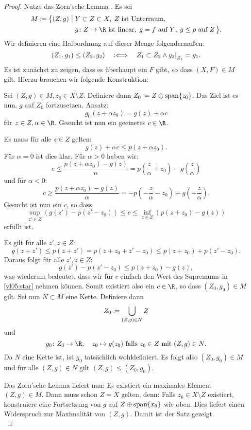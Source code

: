 \begin{proof}
    Nutze das Zorn'sche Lemma .
    Es sei 
    \begin{align*}
        M \defeq 
        \bigl\{ (Z,g) \cMid\big
            &Y\subset Z\subset X, \; \text{$Z$ ist Unterraum},
            \\
            &g\colon Z\to\R \text{ ist linear}, \;
            g=f \text{ auf $Y$}, \; g\leq p \text{ auf $Z$}
        \,\bigr\}
    .  \end{align*}
    Wir definieren eine Halbordnung auf dieser Menge folgendermaßen:
    \[ (Z_1,g_1) \leq (Z_2,g_2)  \quad\eqiff\quad
        Z_1\subset Z_2 \wedge g_2\vert_{\raisebox{-2pt}{$\scriptstyle Z_1$}} = g_1
    . \]
    Es ist zunächst zu zeigen, dass es überhaupt ein $F$ gibt, so dass $(X,F)\in
    M$ gilt. Hierzu brauchen wir folgende Konstruktion:
    
    Sei $(Z,g)\in M, z_0\in X\setminus Z$. Definiere dann $Z_0\coloneqq
    Z\oplus\operatorname{span}\{z_0\}$. Das Ziel ist es nun, $g$ auf $Z_0$ fortzusetzen.
    Ansatz:
    \[ g_0(z+\alpha z_0) = g(z) + \alpha c \]
    für $z\in Z,\alpha\in\R$. Gesucht ist nun ein geeinetes $c\in\R$.
    
    Es muss für alle $z\in Z$ gelten:
    \[ g(z) + \alpha c \leq p(z+\alpha z_0)  . \]
    Für $\alpha=0$ ist dies klar. Für $\alpha>0$ haben wir:
    \[ c \leq \frac{p(z+\alpha z_0)-g(z)}{\alpha} 
        = p\left( \frac{z}{\alpha} + z_0 \right) - g\left( \frac{z}{\alpha} \right)
    \]
    und für $\alpha<0$:
    \[ c \geq \frac{p(z+\alpha z_0)-g(z)}{\alpha} 
        = -p\left( -\frac{z}{\alpha} - z_0 \right) + g\left( -\frac{z}{\alpha} \right)
    . \]
    Gesucht ist nun ein $c$, so dass
    \[ \tag{$\star$} \label{vl05:star}
        \sup_{z'\in Z} \left( g(z') - p(z'-z_0) \right)
        \leq c \leq
        \inf_{z\in Z} \left( p(z+z_0) - g(z) \right)
    \]
    erfüllt ist.
    
    Es gilt für alle $z',z\in Z$:
    \[ g(z+z') \leq p(z+z') 
        = p(z+z_0+z'-z_0) \leq p(z+z_0) + p(z'-z_0)
    . \]
    Daraus folgt für alle $z',z\in Z$:    
    \[ g(z') - p(z'-z_0) \leq p(z+z_0) - g(z)  , \]
    was wiederum bedeutet, dass wir für $c$ einfach den Wert des Supremums 
    in \eqref{vl05:star} nehmen können.
    Somit existiert also ein $c\in\R$, so dass $(Z_0,g_0)\in M$ gilt.
    Sei nun $N\subset M$ eine Kette. Definiere dann
    \[ Z_0 \coloneqq \bigcup_{(Z,g)\in N} Z \]
    und
    \[ g_0\colon Z_0\to\R, \quad z_0\mapsto g(z_0) \text{ falls $z_0\in Z$ mit
        $(Z,g)\in N$}
    . \]
    Da $N$ eine Kette ist, ist $g_0$ tatsächlich wohldefiniert. Es folgt also
    $(Z_0,g_0)\in M$ und für alle $(Z,g)\in N$ gilt $(Z,g)\leq (Z_0,g_0)$.
    
    Das Zorn'sche Lemma liefert nun: Es existiert ein maximales Element
    $(Z,g)\in M$. Dann muss schon $Z=X$ gelten, denn:
    Falls $z_0\in X\setminus Z$ existiert, konstruiere eine Fortsetzung von $g$
    auf $Z\oplus\operatorname{span}\{x_0\}$ wie oben. Dies liefert einen Widerspruch zur
    Maximalität von $(Z,g)$. Damit ist der Satz gezeigt.
    \\
\end{proof}

